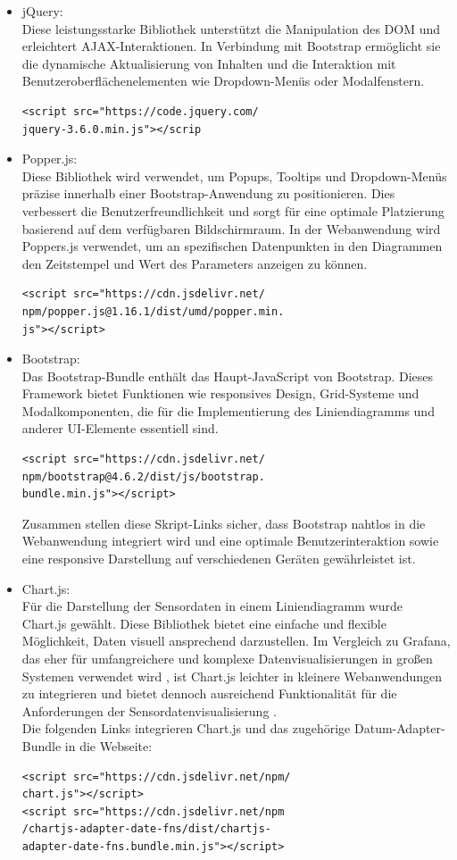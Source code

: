 \documentclass[conference]{IEEEtran}
\begin{document}
\begin{itemize}
\item jQuery: \\
Diese leistungsstarke Bibliothek unterstützt die Manipulation des DOM und erleichtert AJAX-Interaktionen. In Verbindung mit Bootstrap ermöglicht sie die dynamische Aktualisierung von Inhalten und die Interaktion mit Benutzeroberflächenelementen wie Dropdown-Menüs oder Modalfenstern.
\begin{verbatim}
<script src="https://code.jquery.com/
jquery-3.6.0.min.js"></scrip
\end{verbatim}
\item Popper.js: \\
Diese Bibliothek wird verwendet, um Popups, Tooltips und Dropdown-Menüs präzise innerhalb einer Bootstrap-Anwendung zu positionieren. Dies verbessert die Benutzerfreundlichkeit und sorgt für eine optimale Platzierung basierend auf dem verfügbaren Bildschirmraum. In der Webanwendung wird Poppers.js verwendet, um an spezifischen Datenpunkten in den Diagrammen den Zeitstempel und Wert des Parameters anzeigen zu können.
\begin{verbatim}
<script src="https://cdn.jsdelivr.net/
npm/popper.js@1.16.1/dist/umd/popper.min.
js"></script>
\end{verbatim}
\item Bootstrap: \\
Das Bootstrap-Bundle enthält das Haupt-JavaScript von Bootstrap. Dieses Framework bietet Funktionen wie responsives Design, Grid-Systeme und Modalkomponenten, die für die Implementierung des Liniendiagramms und anderer UI-Elemente essentiell sind.
\begin{verbatim}
<script src="https://cdn.jsdelivr.net/
npm/bootstrap@4.6.2/dist/js/bootstrap.
bundle.min.js"></script>
\end{verbatim}
Zusammen stellen diese Skript-Links sicher, dass Bootstrap nahtlos in die Webanwendung integriert wird und eine optimale Benutzerinteraktion sowie eine responsive Darstellung auf verschiedenen Geräten gewährleistet ist. \\
\item Chart.js: \\
Für die Darstellung der Sensordaten in einem Liniendiagramm wurde Chart.js gewählt. Diese Bibliothek bietet eine einfache und flexible Möglichkeit, Daten visuell ansprechend darzustellen. Im Vergleich zu Grafana, das eher für umfangreichere und komplexe Datenvisualisierungen in großen Systemen verwendet wird \cite{grafana}, ist Chart.js leichter in kleinere Webanwendungen zu integrieren und bietet dennoch ausreichend Funktionalität für die Anforderungen der Sensordatenvisualisierung \cite{chart.js}. \\
Die folgenden Links integrieren Chart.js und das zugehörige Datum-Adapter-Bundle in die Webseite:
\begin{verbatim}
<script src="https://cdn.jsdelivr.net/npm/
chart.js"></script>
<script src="https://cdn.jsdelivr.net/npm
/chartjs-adapter-date-fns/dist/chartjs-
adapter-date-fns.bundle.min.js"></script>
\end{verbatim}
\end{itemize}
\end{document}
